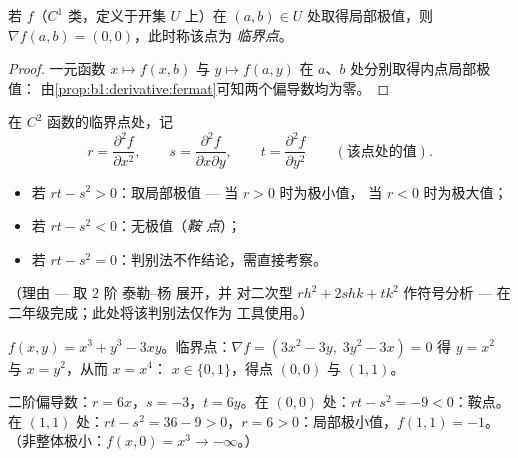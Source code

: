 \begin{theorem}[临界点]\label{thm:b1:multivar:critical}
若 $f$（$C^1$ 类，定义于开集 $U$ 上）在 $(a,b)
\in U$ 处取得局部极值，则 $\nabla f(a,b) = (0,0)$，此时称该点为
\emph{临界点}。
\end{theorem}

\begin{proof}
一元函数 $x \mapsto f(x, b)$ 与 $y \mapsto f(a,
y)$ 在 $a$、$b$ 处分别取得内点局部极值：
由\cref{prop:b1:derivative:fermat}可知两个偏导数均为零。
\end{proof}

\begin{method}\label{met:b1:multivar:monge}
在 $C^2$ 函数的临界点处，记
\[
r = \frac{\partial^2 f}{\partial x^2},
\qquad
s = \frac{\partial^2 f}{\partial x \partial y},
\qquad
t = \frac{\partial^2 f}{\partial y^2}
\qquad (\text{该点处的值}).
\]
\begin{itemize}
  \item 若 $rt - s^2 > 0$：取局部极值 --- 当 $r > 0$ 时为极小值，
        当 $r < 0$ 时为极大值；
  \item 若 $rt - s^2 < 0$：无极值（\emph{鞍
        点}）；
  \item 若 $rt - s^2 = 0$：判别法不作结论，需直接考察。
\end{itemize}
（理由 --- 取 $2$ 阶 泰勒–杨 展开，并
对二次型 $r h^2 + 2shk + tk^2$ 作符号分析 ---
在二年级完成；此处将该判别法仅作为
工具使用。）
\end{method}

\begin{example}\label{ex:b1:multivar:extrema}
$f(x,y) = x^3 + y^3 - 3xy$。临界点：$\nabla f = (3x^2 -
3y,\; 3y^2 - 3x) = 0$ 得 $y = x^2$ 与 $x = y^2$，从而 $x = x^4$：
$x \in \{0, 1\}$，得点 $(0,0)$ 与 $(1,1)$。

二阶偏导数：$r = 6x$，$s = -3$，$t = 6y$。在 $(0,0)$ 处：$rt -
s^2 = -9 < 0$：鞍点。在 $(1,1)$ 处：$rt - s^2 = 36 - 9 > 0$，$r = 6
> 0$：局部极小值，$f(1,1) = -1$。（非整体极小：$f(x, 0) = x^3 \to
-\infty$。）
\end{example}

